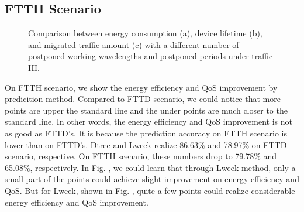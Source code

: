 \documentclass[journal]{IEEEtran}
\begin{document}
\subsection{FTTH Scenario}

\begin{figure*}[!t]
    \centering 
    \caption{Comparison between energy consumption (a), device lifetime (b), and migrated traffic amount (c) with a different number of postponed working wavelengths and postponed periods under traffic-III.} 
    \label{segment} 
\end{figure*}

On FTTH scenario, we show the energy efficiency and QoS improvement by predicition method. Compared to FTTD scenario, we could notice that more points are upper the standard line and the under points are much closer to the standard line. In other words, the energy efficiency and QoS improvement is not as good as FTTD's. It is because the prediction accuracy on FTTH scenario is lower than on FTTD's. Dtree and Lweek realize 86.63\% and 78.97\% on FTTD scenario, respective. On FTTH scenario, these numbers drop to 79.78\% and 65.08\%, respectively. In Fig. , we could learn that through Lweek method, only a small part of the points could achieve slight improvement on energy efficiency and QoS. But for Lweek, shown in Fig. , quite a few points could realize considerable energy efficiency and QoS improvement. 
\end{document}
